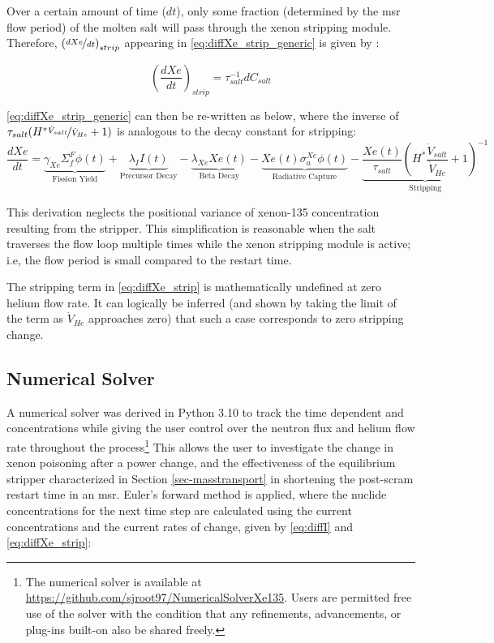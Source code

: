Over a certain amount of time ($dt$), only some fraction (determined by the \acs{msr} flow period) of the molten salt will pass through the xenon stripping module.  Therefore, $\left(\nicefrac{dXe}{dt}\right)_{strip}$ appearing in \ref{eq:diffXe_strip_generic} is given by : 

\begin{equation}\label{eq:dXedt-strip}
    \left(\frac{dXe}{dt}\right)_{strip} = \tau_{salt}^{-1}{dC_{salt}}
\end{equation}



\ref{eq:diffXe_strip_generic} can then be re-written as 
below, where the inverse of $\tau_{salt}(H^*\nicefrac{\dot{V}_{salt}}{\dot{V}_{He}}+1)$ is analogous to the decay constant for stripping: 
\vspace{-0.5\baselineskip}
\begin{equation}\label{eq:diffXe_strip}
        \frac{dXe}{dt} =
        \underbrace{\gamma_{Xe}\Sigma_{f}^{F}{\phi}(t)}_{\text{Fission Yield}}
        +\underbrace{\lambda_{I}I(t)}_{\text{Precursor Decay}}
        -\underbrace{\lambda_{Xe}Xe(t)}_{\text{Beta Decay}}
        -\underbrace{Xe(t)\sigma_{a}^{Xe}{\phi}(t)}_{\text{Radiative Capture}}
        -\underbrace{ \frac{Xe(t)}{\tau_{salt}}\left( H^*\frac{\dot{V}_{salt}}{\dot{V}_{He}}+1 \right)^{-1}}_{\text{Stripping}}
\end{equation}

This derivation neglects the positional variance of xenon-135 concentration resulting from the stripper. This simplification is reasonable when the salt traverses the flow loop multiple times while the xenon stripping module is active; i.e, the flow period is small compared to the restart time.

The stripping term in \ref{eq:diffXe_strip} is mathematically undefined at zero helium flow rate. It can logically be inferred (and shown by taking the limit of the term as $\dot{V}_{He}$ approaches zero) that such a case corresponds to zero stripping change.

\subsection{Numerical Solver} \label{sec-script}
A numerical solver was derived in Python 3.10 to track the time dependent \I and \Xe concentrations while giving the user control over the neutron flux and helium flow rate throughout the process\footnote{The numerical solver is available at \href{https://github.com/sjroot97/NumericalSolverXe135}{https://github.com/sjroot97/NumericalSolverXe135}. Users are permitted free use of the solver with the condition that any refinements, advancements, or plug-ins built-on also be shared freely.} This allows the user to investigate the change in xenon poisoning after a power change, and the effectiveness of the equilibrium stripper characterized in Section \ref{sec-masstransport} in shortening the post-scram restart time in an \acs{msr}. Euler's forward method is applied, where the nuclide concentrations for the next time step are calculated 
using the current concentrations and the current rates of change, given by \ref{eq:diffI} and \ref{eq:diffXe_strip}:

